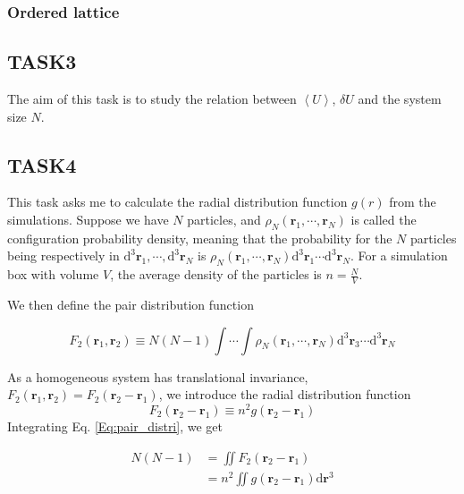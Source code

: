 \documentclass[letterpaper,12pt]{article}
\numberwithin{equation}{section}
\begin{document}
\subsubsection{Ordered lattice}

\subsection{TASK3}
The aim of this task is to study the relation between $\left\langle U\right\rangle$, $\delta U$ and the system size $N$. 

\subsection{TASK4}
This task asks me to calculate the radial distribution function $g(r)$ from the simulations. Suppose we have $N$ particles, and $\rho_N(\boldsymbol{r}_1,\cdots,\boldsymbol{r}_N)$ is called the configuration probability density, meaning that the probability for the $N$ particles being respectively in $\mathrm{d}^3\boldsymbol{r}_1,\cdots,\mathrm{d}^3\boldsymbol{r}_N$ is $\rho_N(\boldsymbol{r}_1,\cdots,\boldsymbol{r}_N)\mathrm{d}^3\boldsymbol{r}_1\cdots\mathrm{d}^3\boldsymbol{r}_N$. For a simulation box with volume $V$, the average density of the particles is $n=\frac{N}{V}$. 

We then define the pair distribution function 

\begin{equation}
    \label{Eq:pair_distri}
    F_2(\boldsymbol{r}_1,\boldsymbol{r}_2)\equiv N(N-1)\int\cdots\int\rho_N(\boldsymbol{r}_1,\cdots,\boldsymbol{r}_N)\mathrm{d}^3\boldsymbol{r}_3\cdots\mathrm{d}^3\boldsymbol{r}_N
\end{equation}

As a homogeneous system has translational invariance, $F_2(\boldsymbol{r}_1,\boldsymbol{r}_2)=F_2(\boldsymbol{r}_2-\boldsymbol{r}_1)$, we introduce the radial distribution function 
\begin{equation}
    F_2(\boldsymbol{r}_2-\boldsymbol{r}_1)\equiv n^2g(\boldsymbol{r}_2-\boldsymbol{r}_1)
\end{equation}
Integrating Eq. \ref{Eq:pair_distri}, we get

\begin{equation}
    \begin{aligned}
        N(N-1)&=\iint{F_2(\boldsymbol{r}_2-\boldsymbol{r}_1)} \\
        &=n^2\iint{g(\boldsymbol{r}_2-\boldsymbol{r}_1)\mathrm{d}\boldsymbol{r}^3}
    \end{aligned}
\end{equation}
\end{document}
